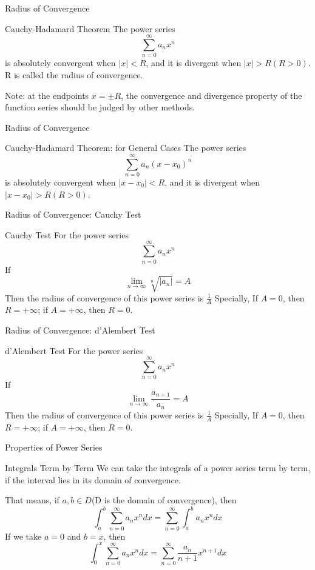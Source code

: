 \documentclass{beamer}
\begin{document}
\begin{frame}{Radius of Convergence}
    \begin{block}{Cauchy-Hadamard Theorem}
    The power series $$\sum\limits_{n=0}^{\infty}a_n x^n$$
    is absolutely convergent when $|x| < R$, and it is divergent when $|x| > R (R > 0)$. R is called the radius of convergence.
    \end{block}
    Note: at the endpoints $x=\pm R$, the convergence and divergence property of the function series should be judged by other methods.
\end{frame}
\begin{frame}{Radius of Convergence}
    \begin{block}{Cauchy-Hadamard Theorem: for General Cases}
    The power series $$\sum\limits_{n=0}^{\infty} a_n (x-x_0)^n$$
    is absolutely convergent when $|x - x_0| < R$, and it is divergent when $|x - x_0| > R (R > 0)$.
    \end{block}
\end{frame}
\begin{frame}{Radius of Convergence: Cauchy Test}
    \begin{block}{Cauchy Test}
    For the power series
$$\sum\limits_{n=0}^{\infty}a_n x^n$$
If
$$\mathop{lim}\limits_{n\rightarrow \infty} \sqrt[n]{|a_n|}=A$$
Then the radius of convergence of this power series is $\frac{1}{A}$
Specially, If $A = 0$, then $R = +\infty$; if $A = +\infty$, then $R = 0$.
    \end{block}
\end{frame}
\begin{frame}{Radius of Convergence: d’Alembert Test}
    \begin{block}{d’Alembert Test}
    For the power series
$$\sum\limits_{n=0}^{\infty}a_n x^n$$
If $$\mathop{lim}\limits_{n\rightarrow \infty} \frac{a_{n+1}}{a_n}=A$$
Then the radius of convergence of this power series is $\frac{1}{A}$
Specially, If $A = 0$, then $R = +\infty$; if $A = +\infty$, then $R = 0$.
    \end{block}
\end{frame}
\begin{frame}{Properties of Power Series}
    \begin{block}{Integrals Term by Term}
    We can take the integrals of a power series term by term, if the interval lies in its domain of convergence.
    \end{block}
That means, if $a,b \in D $(D is the domain of convergence), then
$$\int_a^b \sum\limits_{n=0}^{\infty} a_n x^n dx=\sum\limits_{n=0}^{\infty}\int_a^b a_n x^n dx$$
If we take $a = 0$ and $b = x$, then
$$\int_0^x \sum\limits_{n=0}^{\infty} a_n x^n dx=\sum\limits_{n=0}^{\infty}\frac {a_n}{n+1} x^{n+1} dx$$
\end{frame}
\end{document}
